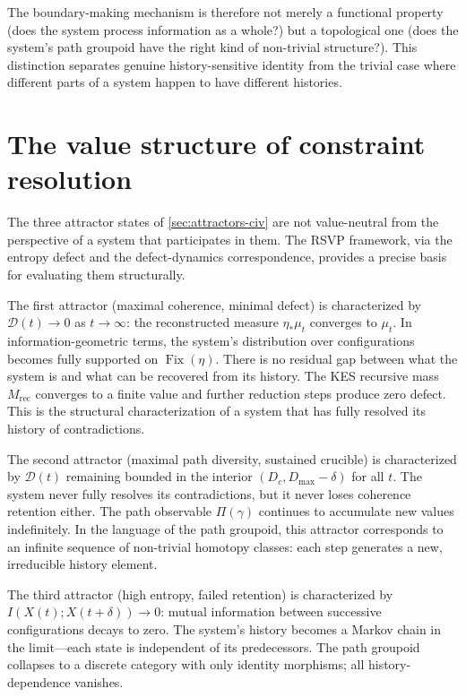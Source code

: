 \documentclass[12pt, oneside]{memoir}
\DeclareMathOperator{\Fix}{Fix}
\begin{document}
The boundary-making mechanism is therefore not merely a functional property (does the
system process information as a whole?) but a topological one (does the system's path
groupoid have the right kind of non-trivial structure?).  This distinction separates
genuine history-sensitive identity from the trivial case where different parts of a system
happen to have different histories.

\section{The value structure of constraint resolution}
\label{sec:value-structure}

The three attractor states of \cref{sec:attractors-civ} are not value-neutral from
the perspective of a system that participates in them.  The RSVP framework, via the
entropy defect and the defect-dynamics correspondence, provides a precise basis for
evaluating them structurally.

The first attractor (maximal coherence, minimal defect) is characterized by
$\mathcal{D}(t) \to 0$ as $t \to \infty$: the reconstructed measure $\eta_*\mu_t$
converges to $\mu_t$.  In information-geometric terms, the system's distribution over
configurations becomes fully supported on $\Fix(\eta)$.  There is no residual gap between
what the system is and what can be recovered from its history.  The KES recursive mass
$M_\text{rec}$ converges to a finite value and further reduction steps produce zero
defect.  This is the structural characterization of a system that has fully resolved its
history of contradictions.

The second attractor (maximal path diversity, sustained crucible) is characterized by
$\mathcal{D}(t)$ remaining bounded in the interior $(D_c, D_{\max} - \delta)$ for all
$t$.  The system never fully resolves its contradictions, but it never loses coherence
retention either.  The path observable $\Pi(\gamma)$ continues to accumulate new values
indefinitely.  In the language of the path groupoid, this attractor corresponds to an
infinite sequence of non-trivial homotopy classes: each step generates a new, irreducible
history element.

The third attractor (high entropy, failed retention) is characterized by $I(X(t);
X(t+\delta)) \to 0$: mutual information between successive configurations decays to zero.
The system's history becomes a Markov chain in the limit---each state is independent of
its predecessors.  The path groupoid collapses to a discrete category with only identity
morphisms; all history-dependence vanishes.
\end{document}

